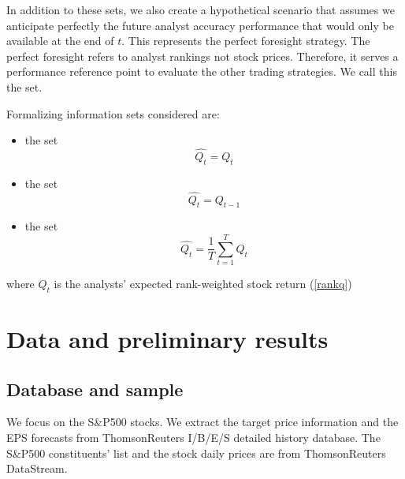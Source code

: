 \documentclass[a4paper,12pt,openright,notitlepage]{report}\usepackage[]{graphicx}\usepackage[]{color}
\begin{document}
In addition to these sets,  we also create a hypothetical scenario that assumes we anticipate perfectly the future analyst accuracy performance  that would only be available at the end of $t$.  This represents the perfect foresight strategy. The perfect foresight refers to analyst rankings not stock prices. Therefore, it serves a performance reference point to evaluate the other trading strategies. We call this the \tr{} set.

Formalizing information sets considered are:
\begin{itemize}
\item  the \tr{} set%
\begin{equation}
\label{q:true}
\widehat{Q_{t}}=Q_{t}
\end{equation}

\item  the \naive{} set %
\begin{equation}
\label{q:naive}
\widehat{Q_{t}}=Q_{t-1}
\end{equation}

\item  the   set%
\begin{equation}
\label{q:default}
\widehat{Q_{t}} = \frac{1}{T} \sum_{t=1}^{T} Q_{t}
\end{equation}
\end{itemize}
where $Q_{t}$ is the analysts' expected rank-weighted stock return (\ref{rankq})

\section{Data and preliminary results}
\label{ch1-sec:rankings}

\subsection{Database and sample}
We focus on the  S\&P500 stocks. We extract the target price information and the EPS forecasts from ThomsonReuters  I/B/E/S detailed history database. The  S\&P500 constituents' list and the stock daily prices are from ThomsonReuters DataStream.
\end{document}
